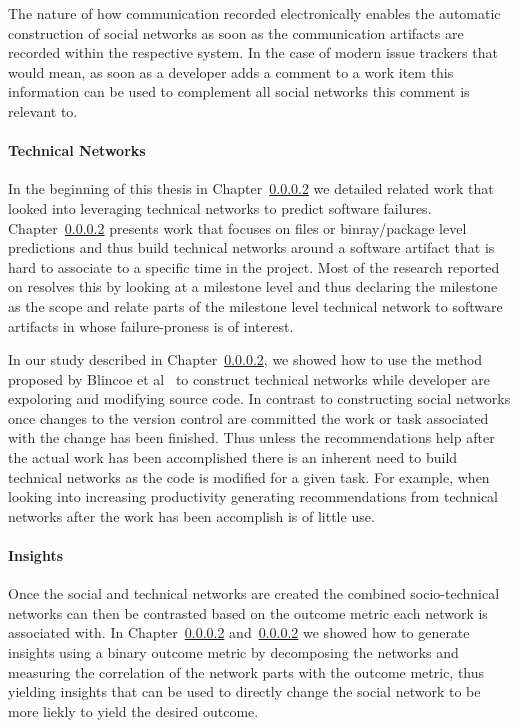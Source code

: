 The nature of how communication recorded electronically enables the automatic construction of social networks as soon as the communication artifacts are recorded within the respective system.
In the case of modern issue trackers that would mean, as soon as a developer adds a comment to a work item this information can be used to complement all social networks this comment is relevant to.

\paragraph{Technical Networks}
In the beginning of this thesis in Chapter~\ref{} we detailed related work that looked into leveraging technical networks to predict software failures.
Chapter~\ref{} presents work that focuses on files or binray/package level predictions and thus build technical networks around a software artifact that is hard to associate to a specific time in the project.
Most of the research reported on resolves this by looking at a milestone level and thus declaring the milestone as the scope and relate parts of the milestone level technical network to software artifacts in whose failure-proness is of interest.

In our study described in Chapter~\ref{}, we showed how to use the method proposed by Blincoe et al~\cite{} to construct technical networks while developer are expoloring and modifying source code.
In contrast to constructing social networks once changes to the version control are committed the work or task associated with the change has been finished.
Thus unless the recommendations help after the actual work has been accomplished there is an inherent need to build technical networks as the code is modified for a given task.
For example, when looking into increasing productivity generating recommendations from technical networks after the work has been accomplish is of little use.

\paragraph{Insights}
Once the social and technical networks are created the combined socio-technical networks can then be contrasted based on the outcome metric each network is associated with.
In Chapter~\ref{} and~\ref{} we showed how to generate insights using a binary outcome metric by decomposing the networks and measuring the correlation of the network parts with the outcome metric, thus yielding insights that can be used to directly change the social network to be more liekly to yield the desired outcome.

